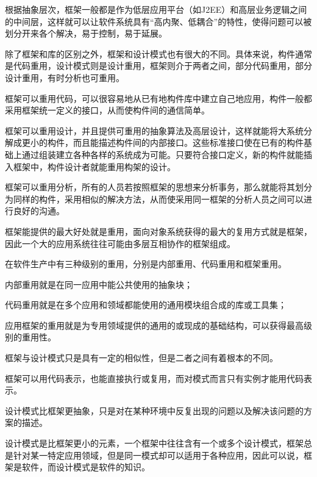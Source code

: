 根据抽象层次，框架一般都是作为低层应用平台（如J2EE）和高层业务逻辑之间的中间层，这样就可以让软件系统具有“高内聚、低耦合”的特性，使得问题可以被划分开来各个解决，易于控制，易于延展。

除了框架和库的区别之外，框架和设计模式也有很大的不同。具体来说，构件通常是代码重用，设计模式则是设计重用，框架则介于两者之间，部分代码重用，部分设计重用，有时分析也可重用。

框架可以重用代码，可以很容易地从已有地构件库中建立自己地应用，构件一般都采用框架统一定义的接口，从而使构件间的通信简单。

框架可以重用设计，并且提供可重用的抽象算法及高层设计，这样就能将大系统分解成更小的构件，而且能描述构件间的内部接口。这些标准接口使在已有的构件基础上通过组装建立各种各样的系统成为可能。只要符合接口定义，新的构件就能插入框架中，构件设计者就能重用构架的设计。

框架可以重用分析，所有的人员若按照框架的思想来分析事务，那么就能将其划分为同样的构件，采用相似的解决方法，从而使采用同一框架的分析人员之间可以进行良好的沟通。

框架能提供的最大好处就是重用，面向对象系统获得的最大的复用方式就是框架，因此一个大的应用系统往往可能由多层互相协作的框架组成。

在软件生产中有三种级别的重用，分别是内部重用、代码重用和框架重用。

\begin{compactitem}
\item 内部重用就是在同一应用中能公共使用的抽象块；
\item 代码重用就是在多个应用和领域都能使用的通用模块组合成的库或工具集；
\item 应用框架的重用就是为专用领域提供的通用的或现成的基础结构，可以获得最高级别的重用性。
\end{compactitem}


框架与设计模式只是具有一定的相似性，但是二者之间有着根本的不同。

\begin{compactitem}
\item 框架可以用代码表示，也能直接执行或复用，而对模式而言只有实例才能用代码表示。
\item 设计模式比框架更抽象，只是对在某种环境中反复出现的问题以及解决该问题的方案的描述。
\end{compactitem}

设计模式是比框架更小的元素，一个框架中往往含有一个或多个设计模式，框架总是针对某一特定应用领域，但是同一模式却可以适用于各种应用，因此可以说，框架是软件，而设计模式是软件的知识。


